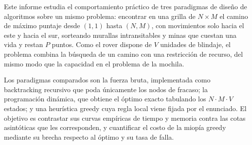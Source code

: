 Este informe estudia el comportamiento práctico de tres paradigmas de diseño de
algoritmos sobre un mismo problema: encontrar en una grilla de $N \times M$ el
camino de máximo puntaje desde $(1,1)$ hasta $(N,M)$, con movimientos solo
hacia el este y hacia el sur, sorteando murallas intransitables y minas que
cuestan una vida y restan $P$ puntos. Como el rover dispone de $V$ unidades de
blindaje, el problema combina la búsqueda de un camino con una restricción de
recurso, del mismo modo que la capacidad en el problema de la mochila.

Los paradigmas comparados son la fuerza bruta, implementada como backtracking
recursivo que poda únicamente los nodos de fracaso; la programación dinámica,
que obtiene el óptimo exacto tabulando los $N \cdot M \cdot V$ estados; y una
heurística greedy cuya regla local viene fijada por el enunciado. El objetivo
es contrastar sus curvas empíricas de tiempo y memoria contra las cotas
asintóticas que les corresponden, y cuantificar el costo de la miopía greedy
mediante su brecha respecto al óptimo y su tasa de falla.
